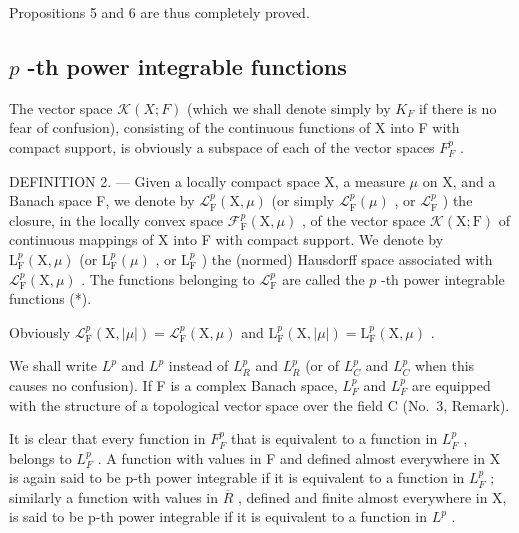 Propositions 5 and 6 are thus completely proved.

\subsection{\texorpdfstring{\(p\) -th power integrable functions}{p -th power integrable functions}}

The vector space \(\mathcal{K}(X;F)\) (which we shall denote simply by \(K_{F}\) if there is no fear of confusion), consisting of the continuous functions of X into F with compact support, is obviously a subspace of each of the vector spaces \(F_{F}^{p}\) .

DEFINITION 2. --- Given a locally compact space X, a measure \(\mu\) on X, and a Banach space F, we denote by \(\mathcal{L}_{\mathrm{F}}^{p}(\mathrm{X},\mu)\) (or simply \(\mathcal{L}_{\mathrm{F}}^{p}(\mu)\) , or \(\mathcal{L}_{\mathrm{F}}^{p}\) ) the closure, in the locally convex space \(\mathcal{F}_{\mathrm{F}}^{p}(\mathrm{X},\mu)\) , of the vector space \(\mathcal{K}(\mathrm{X};\mathrm{F})\) of continuous mappings of X into F with compact support. We denote by \(\mathrm{L}_{\mathrm{F}}^{p}(\mathrm{X},\mu)\) (or \(\mathrm{L}_{\mathrm{F}}^{p}(\mu)\) , or \(\mathrm{L}_{\mathrm{F}}^{p}\) ) the (normed) Hausdorff space associated with \(\mathcal{L}_{\mathrm{F}}^{p}(\mathrm{X},\mu)\) . The functions belonging to \(\mathcal{L}_{\mathrm{F}}^{p}\) are called the \(p\) -th power integrable functions (*).

Obviously \(\mathcal{L}_{\mathrm{F}}^{p}(\mathrm{X},|\mu |) = \mathcal{L}_{\mathrm{F}}^{p}(\mathrm{X},\mu)\) and \(\mathrm{L}_{\mathrm{F}}^{p}(\mathrm{X},|\mu |) = \mathrm{L}_{\mathrm{F}}^{p}(\mathrm{X},\mu)\) .

We shall write \(L^{p}\) and \(L^{p}\) instead of \(L_{R}^{p}\) and \(L_{R}^{p}\) (or of \(L_{C}^{p}\) and \(L_{C}^{p}\) when this causes no confusion). If F is a complex Banach space, \(L_{F}^{p}\) and \(L_{F}^{p}\) are equipped with the structure of a topological vector space over the field C (No.~3, Remark).

It is clear that every function in \(F_{F}^{p}\) that is equivalent to a function in \(L_{F}^{p}\) , belongs to \(L_{F}^{p}\) . A function with values in F and defined almost everywhere in X is again said to be p-th power integrable if it is equivalent to a function in \(L_{F}^{p}\) ; similarly a function with values in \(\overline{R}\) , defined and finite almost everywhere in X, is said to be p-th power integrable if it is equivalent to a function in \(L^{p}\) .

